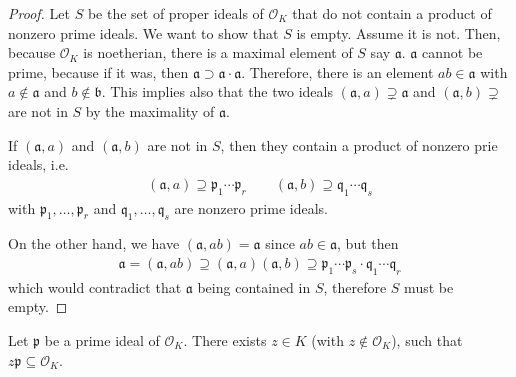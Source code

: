 \begin{proof}
    Let \(S\) be the set of proper ideals of \(\mathcal{O}_K\) that do not contain a product of nonzero prime ideals. We want to show that \(S\) is empty. Assume it is not. Then, because \(\mathcal{O}_K\) is noetherian, there is a maximal element of \(S\) say \(\mathfrak{a}\). \(\mathfrak{a}\) cannot be prime, because if it was, then \(\mathfrak{a} \supset \mathfrak{a} \cdot \mathfrak{a}\). Therefore, there is an element \(ab \in \mathfrak{a}\) with \(a \not\in \mathfrak{a}\) and \(b \not\in \mathfrak{b}\). This implies also that the two ideals \((\mathfrak{a}, a) \supsetneq \mathfrak{a}\) and \((\mathfrak{a}, b) \supsetneq\) are not in \(S\) by the maximality of \(\mathfrak{a}\).

    If \((\mathfrak{a}, a)\) and \((\mathfrak{a}, b)\) are not in \(S\), then they contain a product of nonzero prie ideals, i.e.
    \begin{align*}
        (\mathfrak{a}, a) \supseteq \mathfrak{p}_1 \cdots \mathfrak{p}_r \qquad (\mathfrak{a}, b) \supseteq \mathfrak{q}_1 \cdots \mathfrak{q}_s
    \end{align*}
    with \(\mathfrak{p}_1, \ldots, \mathfrak{p}_r\) and \(\mathfrak{q}_1, \ldots, \mathfrak{q}_s\) are nonzero prime ideals.

    On the other hand, we have \((\mathfrak{a}, ab) = \mathfrak{a}\) since \(ab \in \mathfrak{a}\), but then
    \begin{align*}
        \mathfrak{a} = (\mathfrak{a}, ab) \supseteq (\mathfrak{a}, a) (\mathfrak{a}, b) \supseteq \mathfrak{p}_1 \cdots \mathfrak{p}_s \cdot \mathfrak{q}_1 \cdots \mathfrak{q}_r
    \end{align*}
    which would contradict that \(\mathfrak{a}\) being contained in \(S\), therefore \(S\) must be empty.
\end{proof}

\begin{thmbox}
    \begin{lemma}
        Let \(\mathfrak{p}\) be a prime ideal of \(\mathcal{O}_K\). There exists \(z \in K\) (with \(z \not\in \mathcal{O}_K\)), such that \(z \mathfrak{p} \subseteq \mathcal{O}_K\).
    \end{lemma}
\end{thmbox}

